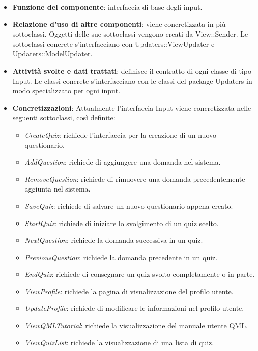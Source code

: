 \documentclass[a4paper,11pt]{article}
\begin{document}
			\begin{itemize}
				\item\textbf{Funzione del componente}: interfaccia di base degli input.
				\item\textbf{Relazione d'uso di altre componenti}: viene concretizzata in più sottoclassi. Oggetti delle sue sottoclassi vengono creati da View::Sender. Le sottoclassi concrete s'interfacciano con Updaters::ViewUpdater e Updaters::ModelUpdater.
				\item\textbf{Attività svolte e dati trattati}: definisce il contratto di ogni classe di tipo Input. Le classi concrete s'interfacciano con le classi del package Updaters in modo specializzato per ogni input.
				\item\textbf{Concretizzazioni}: Attualmente l'interfaccia Input viene concretizzata nelle seguenti sottoclassi, così definite:
				\begin{itemize}
				\item\textit{CreateQuiz}: richiede l'interfaccia per la creazione di un nuovo questionario.
				\item\textit{AddQuestion}: richiede di aggiungere una domanda nel sistema.
				\item\textit{RemoveQuestion}: richiede di rimuovere una domanda precedentemente aggiunta nel sistema.
				\item\textit{SaveQuiz}: richiede di salvare un nuovo questionario appena creato.
				\item\textit{StartQuiz}: richiede di iniziare lo svolgimento di un quiz scelto.
				\item\textit{NextQuestion}: richiede la domanda successiva in un quiz.
				\item\textit{PreviousQuestion}: richiede la domanda precedente in un quiz.
				\item\textit{EndQuiz}: richiede di consegnare un quiz svolto completamente o in parte.
				\item\textit{ViewProfile}: richiede la pagina di visualizzazione del profilo utente.
				\item\textit{UpdateProfile}: richiede di modificare le informazioni nel profilo utente.
				\item\textit{ViewQMLTutorial}: richiede la visualizzazione del manuale utente QML.
				\item\textit{ViewQuizList}: richiede la visualizzazione di una lista di quiz.
				\end{itemize}
			\end{itemize}
\end{document}
